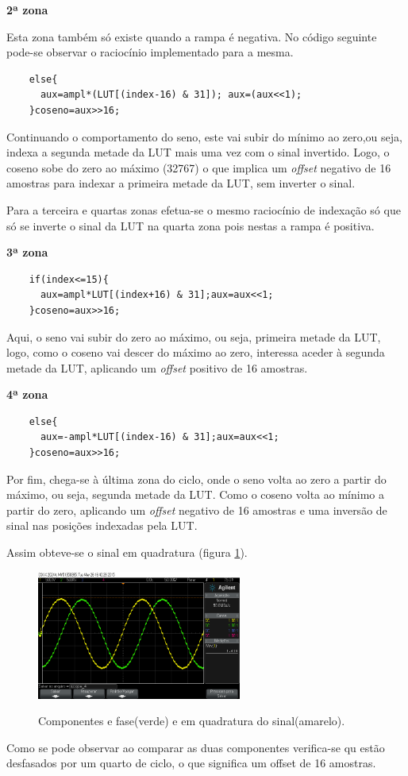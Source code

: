 \documentclass[11pt]{article}
\numberwithin{equation}{section}
\begin{document}
\textbf{2ª zona}

Esta zona também só existe quando a rampa é negativa. No código seguinte pode-se observar o raciocínio implementado para a mesma.
\begin{lstlisting}
	else{
	  aux=ampl*(LUT[(index-16) & 31]); aux=(aux<<1);
	}coseno=aux>>16;
\end{lstlisting}
Continuando o comportamento do seno, este vai subir do mínimo ao zero,ou seja, indexa a segunda metade da LUT mais uma vez com o sinal invertido. Logo, o coseno sobe do zero ao máximo (32767) o que implica um \textit{offset} negativo de 16 amostras para indexar a primeira metade da LUT, sem inverter o sinal.

Para a terceira e quartas zonas efetua-se o mesmo raciocínio de indexação só que só se inverte o sinal da LUT na quarta zona pois nestas a rampa é positiva.
\vspace{1mm}

\textbf{3ª zona}
\begin{lstlisting}
	if(index<=15){
	  aux=ampl*LUT[(index+16) & 31];aux=aux<<1;
	}coseno=aux>>16;
\end{lstlisting}
Aqui, o seno vai subir do zero ao máximo, ou seja, primeira metade da LUT, logo, como o coseno vai descer do máximo ao zero, interessa aceder à segunda metade da LUT, aplicando um \textit{offset} positivo de 16 amostras.
\vspace{1mm}

\textbf{4ª zona}
\begin{lstlisting}
	else{
	  aux=-ampl*LUT[(index-16) & 31];aux=aux<<1;
	}coseno=aux>>16;
\end{lstlisting}
Por fim, chega-se à última zona do ciclo, onde o seno volta ao zero a partir do máximo, ou seja, segunda metade da LUT. Como o coseno volta ao mínimo a partir do zero, aplicando um \textit{offset} negativo de 16 amostras e uma inversão de sinal nas posições indexadas pela LUT.

Assim obteve-se o sinal em quadratura (figura \ref{quad}).
\begin{figure}[h]
	\centering
	\includegraphics[width=0.6\textwidth]{./quadratura}~\\
	\caption{Componentes e fase(verde) e em quadratura do sinal(amarelo).}
	\label{quad}
\end{figure}
Como se pode observar ao comparar as duas componentes verifica-se qu estão desfasados por um quarto de ciclo, o que significa um offset de 16 amostras.
\end{document}
